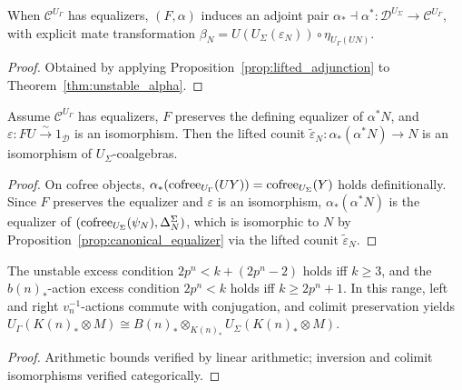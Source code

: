 \begin{theorem}
  \label{thm:unstable_lifted_adj}
  \leanok
  When $\mathcal{C}^{U_{\Gamma}}$ has equalizers, $(F, \alpha)$ induces an adjoint pair $\alpha_* \dashv \alpha^* : \mathcal{D}^{U_{\Sigma}} \to \mathcal{C}^{U_{\Gamma}}$, with explicit mate transformation $\beta_N = U(U_{\Sigma}(\varepsilon_N)) \circ \eta_{U_{\Gamma}(UN)}$.
\end{theorem}
\begin{proof}
  \leanok
  Obtained by applying Proposition~\ref{prop:lifted_adjunction} to Theorem~\ref{thm:unstable_alpha}.
\end{proof}

\begin{theorem}
  \label{thm:unstable_counit_iso}
  \leanok
  Assume $\mathcal{C}^{U_{\Gamma}}$ has equalizers, $F$ preserves the defining equalizer of $\alpha^* N$, and $\varepsilon : FU \xrightarrow{\sim} 1_{\mathcal{D}}$ is an isomorphism. Then the lifted counit $\tilde{\varepsilon}_N : \alpha_*(\alpha^* N) \to N$ is an isomorphism of $U_{\Sigma}$-coalgebras.
\end{theorem}
\begin{proof}
  \leanok
  On cofree objects, $\alpha_*(\operatorname{cofree}_{U_{\Gamma}}(UY)) = \operatorname{cofree}_{U_{\Sigma}}(Y)$ holds definitionally. Since $F$ preserves the equalizer and $\varepsilon$ is an isomorphism, $\alpha_*(\alpha^* N)$ is the equalizer of $(\operatorname{cofree}_{U_{\Sigma}}(\psi_N), \Delta^{\Sigma}_N)$, which is isomorphic to $N$ by Proposition~\ref{prop:canonical_equalizer} via the lifted counit $\tilde{\varepsilon}_N$.
\end{proof}

\begin{proposition}
  \label{prop:excess_and_colimit}
  \leanok
  The unstable excess condition $2p^n < k + (2p^n - 2)$ holds iff $k \ge 3$, and the $b(n)_*$-action excess condition $2p^n < k$ holds iff $k \ge 2p^n + 1$. In this range, left and right $v_n^{-1}$-actions commute with conjugation, and colimit preservation yields $U_{\Gamma}(K(n)_* \otimes M) \cong B(n)_* \otimes_{K(n)_*} U_{\Sigma}(K(n)_* \otimes M)$.
\end{proposition}
\begin{proof}
  \leanok
  Arithmetic bounds verified by linear arithmetic; inversion and colimit isomorphisms verified categorically.
\end{proof}

